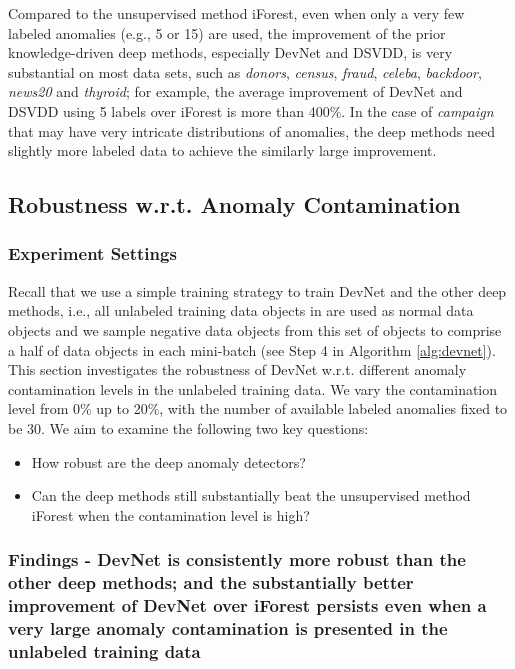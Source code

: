 \documentclass[sigconf]{acmart}
\begin{document}
Compared to the unsupervised method iForest, even when only a very few labeled anomalies (e.g., 5 or 15) are used, the improvement of the prior knowledge-driven deep methods, especially DevNet and DSVDD, is very substantial on most data sets, such as \textit{donors}, \textit{census}, \textit{fraud}, \textit{celeba}, \textit{backdoor}, \textit{news20} and \textit{thyroid}; for example, the average improvement of DevNet and DSVDD using 5 labels over iForest is more than 400\%. In the case of \textit{campaign} that may have very intricate distributions of anomalies, the deep methods need slightly more labeled data to achieve the similarly large improvement.


\subsection{Robustness w.r.t. Anomaly Contamination}\label{exp:contamination}

\subsubsection{Experiment Settings}
Recall that we use a simple training strategy to train DevNet and the other deep methods, i.e., all unlabeled training data objects in  are used as normal data objects and we sample negative data objects from this set of objects to comprise a half of data objects in each mini-batch (see Step 4 in Algorithm \ref{alg:devnet}). This section investigates the robustness of DevNet w.r.t. different anomaly contamination levels in the unlabeled training data. We vary the contamination level from 0\% up to 20\%, with the number of available labeled anomalies fixed to be 30. We aim to examine the following two key questions: 
\begin{itemize}
    \item How robust are the deep anomaly detectors?
    \item Can the deep methods still substantially beat the unsupervised method iForest when the contamination level is high? 
\end{itemize}


\subsubsection{Findings - DevNet is consistently more robust than the other deep methods; and the substantially better improvement of DevNet over iForest persists even when a very large anomaly contamination is presented in the unlabeled training data}
\end{document}
